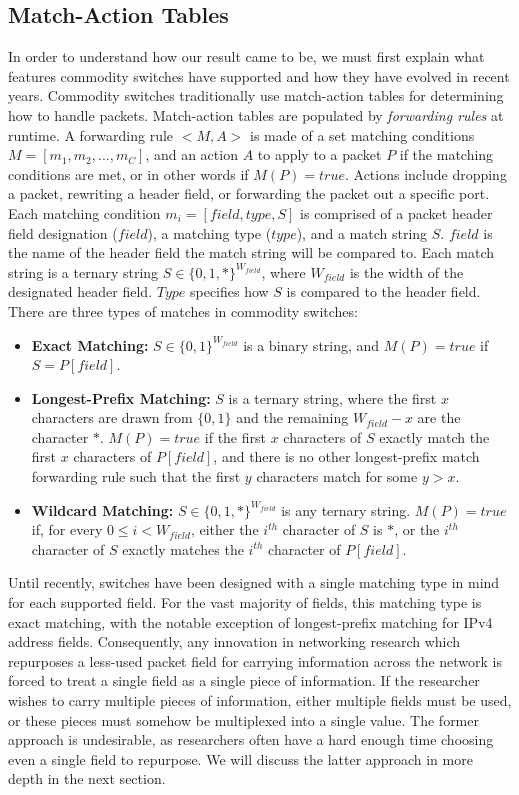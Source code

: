 \subsection{Match-Action Tables}
In order to understand how our result came to be, we must first explain what features commodity switches have supported and how they have evolved in recent years. Commodity switches traditionally use match-action tables for determining how to handle packets. Match-action tables are populated by \textit{forwarding rules} at runtime. A forwarding rule $<M, A>$ is made of a set matching conditions $M = [m_1, m_2, ..., m_C]$, and an action $A$ to apply to a packet $P$ if the matching conditions are met, or in other words if $M(P) = true$. Actions include dropping a packet, rewriting a header field, or forwarding the packet out a specific port. Each matching condition $m_i = [field, type, S]$ is comprised of a packet header field designation ($field$), a matching type ($type$), and a match string $S$. $field$ is the name of the header field the match string will be compared to. Each match string is a ternary string $S \in \{0,1,*\}^{W_{field}}$, where $W_{field}$ is the width of the designated header field. $Type$ specifies how $S$ is compared to the header field. There are three types of matches in commodity switches:
  \begin{itemize}
  \item{\textbf{Exact Matching:} $S \in \{0,1\}^{W_{field}}$ is a binary string, and $M(P) = true$ if $S = P[field]$.}\\
  \item{\textbf{Longest-Prefix Matching:} $S$ is a ternary string, where the first $x$ characters are drawn from $\{0,1\}$ and the remaining $W_{field} - x$ are the character $*$. $M(P) = true$ if the first $x$ characters of $S$ exactly match the first $x$ characters of $P[field]$, and there is no other longest-prefix match forwarding rule such that the first $y$ characters match for some $y > x$.}\\
  \item{\textbf{Wildcard Matching:} $S \in \{0,1,*\}^{W_{field}}$ is any ternary string. $M(P) = true$ if, for every $0 \le i < W_{field}$, either the $i^{th}$ character of $S$ is $*$, or the $i^{th}$ character of $S$ exactly matches the $i^{th}$ character of $P[field]$.}
  \end{itemize}
  
  Until recently, switches have been designed with a single matching type in mind for each supported field. For the vast majority of fields, this matching type is exact matching, with the notable exception of longest-prefix matching for IPv4 address fields. Consequently, any innovation in networking research which repurposes a less-used packet field for carrying information across the network is forced to treat a single field as a single piece of information. If the researcher wishes to carry multiple pieces of information, either multiple fields must be used, or these pieces must somehow be multiplexed into a single value. The former approach is undesirable, as researchers often have a hard enough time choosing even a single field to repurpose. We will discuss the latter approach in more depth in the next section. 
  
